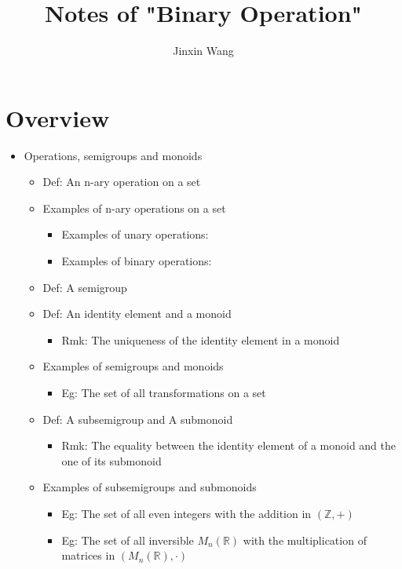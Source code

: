 \documentclass[onecolumn]{ctexart}
\title{Notes of "Binary Operation"}
\author{Jinxin Wang}
\date{}
\begin{document}
\maketitle

\section{Overview}

\begin{itemize}
  \item Operations, semigroups and monoids
  \begin{itemize}
    \item Def: An n-ary operation on a set
    \item Examples of n-ary operations on a set
    \begin{itemize}
      \item Examples of unary operations: 
      \item Examples of binary operations: 
    \end{itemize}
    \item Def: A semigroup
    \item Def: An identity element and a monoid
    \begin{itemize}
      \item Rmk: The uniqueness of the identity element in a monoid
    \end{itemize}
    \item Examples of semigroups and monoids
    \begin{itemize}
      \item Eg: The set of all transformations on a set
    \end{itemize}
    \item Def: A subsemigroup and A submonoid
    \begin{itemize}
      \item Rmk: The equality between the identity element of a monoid and the one of its submonoid
    \end{itemize}
    \item Examples of subsemigroups and submonoids
    \begin{itemize}
      \item Eg: The set of all even integers with the addition in $(\mathbb{Z}, +)$
      \item Eg: The set of all inversible $M_n(\mathbb{R})$ with the multiplication of matrices in $(M_n(\mathbb{R}), \cdot)$
    \end{itemize}

\end{itemize}
\end{itemize}
\end{document}
